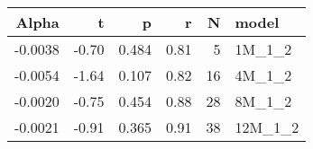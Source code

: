 \begin{table}[ht]
\centering
\begin{tabular}{rrrrrl}
  \hline
Alpha & t & p & r & N & model \\ 
  \hline
-0.0038 & -0.70 & 0.484 & 0.81 & 5 & 1M\_1\_2 \\ 
  -0.0054 & -1.64 & 0.107 & 0.82 & 16 & 4M\_1\_2 \\ 
  -0.0020 & -0.75 & 0.454 & 0.88 & 28 & 8M\_1\_2 \\ 
  -0.0021 & -0.91 & 0.365 & 0.91 & 38 & 12M\_1\_2 \\ 
   \hline
\end{tabular}
\end{table}

